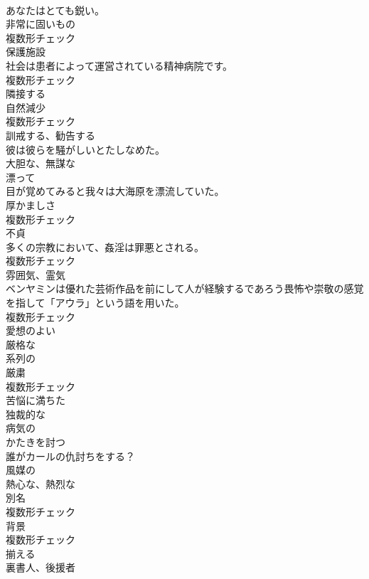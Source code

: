 \documentclass[8pt]{extreport}
\begin{document}
\begin{CJK}{UTF8}{min}
\\	あなたはとても鋭い。	
\\	[名詞]	非常に固いもの	
\\	複数形チェック
\\	[名詞]	保護施設	
\\	社会は患者によって運営されている精神病院です。	
\\	複数形チェック
\\	[形容詞]	隣接する	
\\	[名詞]	自然減少	
\\	複数形チェック
\\	[動詞]	訓戒する、勧告する	
\\	彼は彼らを騒がしいとたしなめた。	
\\	[形容詞]	大胆な、無謀な	
\\	[形容詞]	漂って	
\\	目が覚めてみると我々は大海原を漂流していた。	
\\	[名詞]	厚かましさ	
\\	複数形チェック
\\	[名詞]	不貞	
\\	多くの宗教において、姦淫は罪悪とされる。	
\\	複数形チェック
\\	[名詞]	雰囲気、霊気	
\\	ベンヤミンは優れた芸術作品を前にして人が経験するであろう畏怖や崇敬の感覚を指して「アウラ」という語を用いた。	
\\	複数形チェック
\\	[形容詞]	愛想のよい	
\\	[形容詞]	厳格な	
\\	[形容詞]	系列の	
\\	[名詞]	厳粛	
\\	複数形チェック
\\	[形容詞]	苦悩に満ちた	
\\	[形容詞]	独裁的な	
\\	[形容詞]	病気の	
\\	[動詞]	かたきを討つ	
\\	誰がカールの仇討ちをする？	
\\	[形容詞]	風媒の	
\\	[形容詞]	熱心な、熱烈な	
\\	[名詞]	別名	
\\	複数形チェック
\\	[名詞]	背景	
\\	複数形チェック
\\	[動詞]	揃える	
\\	[名詞]	裏書人、後援者	

\end{CJK}
\end{document}

